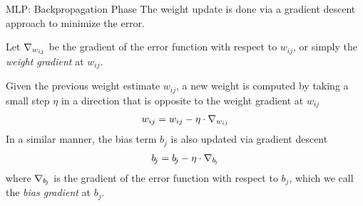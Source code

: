 \begin{frame}{MLP: Backpropagation Phase}
The weight update is done via a gradient descent approach to minimize
the error. 

\medskip

Let $\nabla_{w_{ij}}$ be the gradient of the error function with
respect to $w_{ij}$, or simply the {\em weight gradient} at
$w_{ij}$.

\medskip

Given the previous weight estimate $w_{ij}$, 
a new weight is computed by taking a
small step $\eta$ in a direction that is opposite to the weight gradient 
at $w_{ij}$
\begin{align*}
    w_{ij} = w_{ij} - \eta \cdot \nabla_{w_{ij}}
\end{align*}
In a similar manner, the bias term $b_{\!j}$ is also updated via gradient
descent
\begin{align*}
    b_{\!j} = b_{\!j} - \eta \cdot \nabla_{b_{\!j}}
\end{align*}
where 
$\nabla_{b_{\!j}}$ is the gradient of the error function with
respect to $b_{\!j}$, which we call the {\em bias gradient} at
$b_{\!j}$.
\end{frame}
%
%
